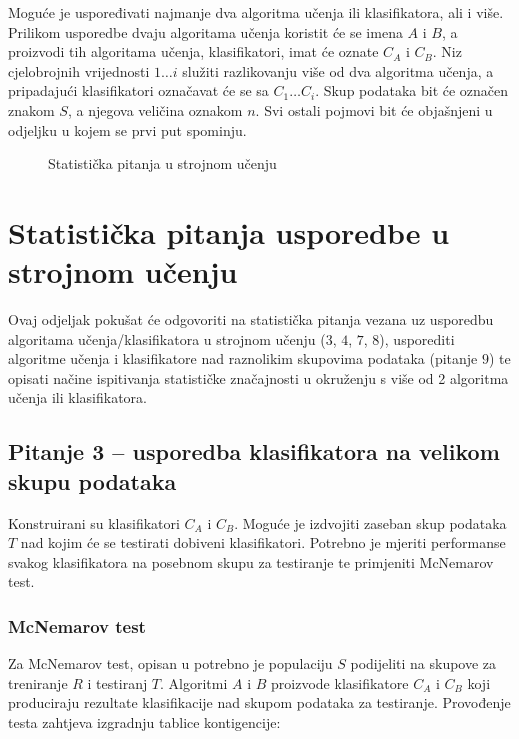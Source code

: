 Moguće je uspoređivati najmanje dva algoritma učenja ili klasifikatora, ali i više. Prilikom usporedbe dvaju algoritama učenja koristit će se imena $A$ i $B$, a proizvodi tih algoritama učenja, klasifikatori, imat će oznate $C_A$ i $C_B$. Niz cjelobrojnih vrijednosti $1\dots i$ služiti razlikovanju više od dva algoritma učenja, a pripadajući klasifikatori označavat će se sa $C_1 \dots C_i$. Skup podataka bit će označen znakom $S$, a njegova veličina oznakom $n$. Svi ostali pojmovi bit će objašnjeni u odjeljku u kojem se prvi put spominju.

\begin{figure}[h]
\centering

\caption{Statistička pitanja u strojnom učenju}
\label{fig:stat_questions}
\end{figure}

\section{Statistička pitanja usporedbe u strojnom učenju}

Ovaj odjeljak pokušat će odgovoriti na statistička pitanja vezana uz usporedbu algoritama učenja/klasifikatora u strojnom učenju ($3$, $4$, $7$, $8$), usporediti algoritme učenja i klasifikatore nad raznolikim skupovima podataka (pitanje $9$) te opisati načine ispitivanja statističke značajnosti u okruženju s više od 2 algoritma učenja ili klasifikatora.

\subsection{Pitanje 3 -- usporedba klasifikatora na velikom skupu podataka}
\label{subsec:pitanje3}

Konstruirani su klasifikatori $C_A$ i $C_B$. Moguće je izdvojiti zaseban skup podataka $T$ nad kojim će se testirati dobiveni klasifikatori. Potrebno je mjeriti performanse svakog klasifikatora na posebnom skupu za testiranje te primjeniti McNemarov test.

\subsubsection{McNemarov test}

Za McNemarov test, opisan u \citep{everitt1992analysis} potrebno je populaciju $S$ podijeliti na skupove za treniranje $R$ i testiranj $T$. Algoritmi $A$ i $B$ proizvode klasifikatore $C_A$ i $C_B$ koji produciraju rezultate klasifikacije nad skupom podataka za testiranje. Provođenje testa zahtjeva izgradnju tablice kontigencije:

